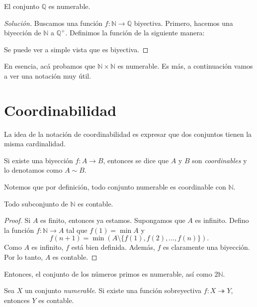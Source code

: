 \begin{example}
	El conjunto $\mathbb{Q}$ es numerable.
\end{example}

\begin{proof}[Solución]
	Buscamos una función $f : \mathbb{N} \to \mathbb{Q}$ biyectiva. Primero, hacemos una biyección de $\mathbb{N}$ a $\mathbb{Q}^+$. Definimos la función de la siguiente manera:
	\begin{center}
		
	\end{center}
	Se puede ver a simple vista que es biyectiva.
\end{proof}

En esencia, acá probamos que $\mathbb{N} \times \mathbb{N}$ es numerable. Es más, a continuación vamos a ver una notación muy útil.

\section{Coordinabilidad}

La idea de la notación de coordinabilidad es expresar que dos conjuntos tienen la misma cardinalidad.

\begin{definition}
	Si existe una biyección $f: A \to  B$, entonces se dice que $A$ y $B$ son \emph{coordinables} y lo denotamos como $A \sim B$.
\end{definition}

Notemos que por definición, todo conjunto numerable es coordinable con $\mathbb{N}$.

\begin{lemma}
	Todo subconjunto de $\mathbb{N}$ es contable.
\end{lemma}

\begin{proof}
	Si $A$ es finito, entonces ya estamos. Supongamos que $A$ es infinito. Defino la función $f: \mathbb{N} \to A$ tal que $f(1) = \min A$ y
	\begin{equation*}
		f(n+1) = \min (A \setminus \{ f(1), f(2), \dots, f(n) \}).
	\end{equation*}
	Como $A$ es infinito, $f$ está bien definida. Además, $f$ es claramente una biyección. Por lo tanto, $A$ es contable.
\end{proof}

Entonces, el conjunto de los números primos es numerable, así como $2 \mathbb{N}$.

\begin{proposition}
	Sea $X$ un conjunto \textit{numerable}. Si existe una función sobreyectiva $f: X \twoheadrightarrow Y$, entonces $Y$ es contable.
\end{proposition}

